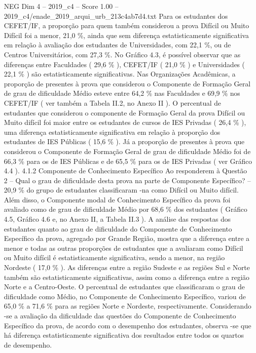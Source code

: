 \begin{textsample}{NEG Dim 4 – 2019\_c4 – Score 1.00 – 2019\_c4/enade\_2019\_arqui\_urb\_213c4ab7d4.txt}
Para os estudantes dos CEFET/IF, a proporção para quem também considerou a prova Difícil ou Muito Difícil foi a menor, 21,0 \%, ainda que sem diferença estatisticamente significativa em relação à avaliação dos estudantes de Universidades, com 22,1 \%, ou de Centros Universitários, com 27,3 \%.
No Gráfico 4.3, é possível observar que as diferenças entre Faculdades ( 29,6 \% ), CEFET/IF ( 21,0 \% ) e Universidades ( 22,1 \% ) são estatisticamente significativas.
Nas Organizações Acadêmicas, a proporção de presentes à prova que considerou o Componente de Formação Geral de grau de dificuldade Médio esteve entre 64,2 \% nas Faculdades e 69,9 \% nos CEFET/IF ( ver também a Tabela II.2, no Anexo II ).
O percentual de estudantes que considerou o componente de Formação Geral da prova Difícil ou Muito difícil foi maior entre os estudantes de cursos de IES Privadas ( 26,4 \% ), uma diferença estatisticamente significativa em relação à proporção dos estudantes de IES Públicas ( 15,6 \% ).
Já a proporção de presentes à prova que considerou o Componente de Formação Geral de grau de dificuldade Médio foi de 66,3 \% para os de IES Públicas e de 65,5 \% para os de IES Privadas ( ver Gráfico 4.4 ). 4.1.2 Componente de Conhecimento Específico Ao responderem à Questão 2 – Qual o grau de dificuldade desta prova na parte de Componente Específico? – 20,9 \% do grupo de estudantes classificaram -na como Difícil ou Muito difícil.
Além disso, o Componente modal de Conhecimento Específico da prova foi avaliado como de grau de dificuldade Médio por 68,6 \% dos estudantes ( Gráfico 4.5, Gráfico 4.6 e, no Anexo II, a Tabela II.3 ).
A análise das respostas dos estudantes quanto ao grau de dificuldade do Componente de Conhecimento Específico da prova, agregado por Grande Região, mostra que a diferença entre a menor e todas as outras proporções de estudantes que a avaliaram como Difícil ou Muito difícil é estatisticamente significativa, sendo a menor, na região Nordeste ( 17,0 \% ).
As diferenças entre a região Sudeste e as regiões Sul e Norte também são estatisticamente significativas, assim como a diferença entre a região Norte e a Centro-Oeste.
O percentual de estudantes que classificaram o grau de dificuldade como Médio, no Componente de Conhecimento Específico, variou de 65,0 \% a 71,6 \% para as regiões Norte e Nordeste, respectivamente.
Considerando -se a avaliação da dificuldade das questões do Componente de Conhecimento Específico da prova, de acordo com o desempenho dos estudantes, observa -se que há diferença estatisticamente significativa dos resultados entre todos os quartos de desempenho.

\end{textsample}
